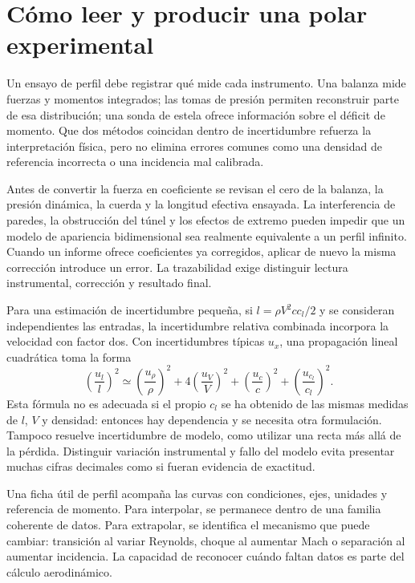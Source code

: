 \section{Cómo leer y producir una polar experimental}
Un ensayo de perfil debe registrar qué mide cada instrumento. Una balanza mide fuerzas y momentos integrados; las tomas de presión permiten reconstruir parte de esa distribución; una sonda de estela ofrece información sobre el déficit de momento. Que dos métodos coincidan dentro de incertidumbre refuerza la interpretación física, pero no elimina errores comunes como una densidad de referencia incorrecta o una incidencia mal calibrada.

Antes de convertir la fuerza en coeficiente se revisan el cero de la balanza, la presión dinámica, la cuerda y la longitud efectiva ensayada. La interferencia de paredes, la obstrucción del túnel y los efectos de extremo pueden impedir que un modelo de apariencia bidimensional sea realmente equivalente a un perfil infinito. Cuando un informe ofrece coeficientes ya corregidos, aplicar de nuevo la misma corrección introduce un error. La trazabilidad exige distinguir lectura instrumental, corrección y resultado final.

Para una estimación de incertidumbre pequeña, si $l=\rho V^2cc_l/2$ y se consideran independientes las entradas, la incertidumbre relativa combinada incorpora la velocidad con factor dos. Con incertidumbres típicas $u_x$, una propagación lineal cuadrática toma la forma
\begin{equation}
\left(\frac{u_l}{l}\right)^2\simeq
\left(\frac{u_\rho}{\rho}\right)^2+
4\left(\frac{u_V}{V}\right)^2+
\left(\frac{u_c}{c}\right)^2+
\left(\frac{u_{c_l}}{c_l}\right)^2.
\end{equation}
Esta fórmula no es adecuada si el propio $c_l$ se ha obtenido de las mismas medidas de $l$, $V$ y densidad: entonces hay dependencia y se necesita otra formulación. Tampoco resuelve incertidumbre de modelo, como utilizar una recta más allá de la pérdida. Distinguir variación instrumental y fallo del modelo evita presentar muchas cifras decimales como si fueran evidencia de exactitud.

Una ficha útil de perfil acompaña las curvas con condiciones, ejes, unidades y referencia de momento. Para interpolar, se permanece dentro de una familia coherente de datos. Para extrapolar, se identifica el mecanismo que puede cambiar: transición al variar Reynolds, choque al aumentar Mach o separación al aumentar incidencia. La capacidad de reconocer cuándo faltan datos es parte del cálculo aerodinámico.

